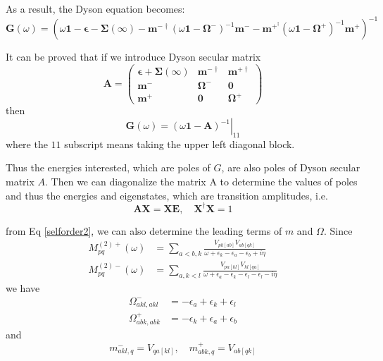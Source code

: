As a result, the Dyson equation becomes:
\begin{equation}
	\boldsymbol{G}(\omega)=\left(\omega \mathbf{1}-\boldsymbol{\epsilon}-\boldsymbol{\Sigma}(\infty)-\boldsymbol{m}^{-\dagger}\left(\omega \mathbf{1}-\boldsymbol{\Omega}^{-}\right)^{-1} \boldsymbol{m}^{-}-\boldsymbol{m}^{+^{\dagger}}\left(\omega \mathbf{1}-\boldsymbol{\Omega}^{+}\right)^{-1} \boldsymbol{m}^{+}\right)^{-1}
\end{equation}

It can be proved that if we introduce Dyson secular matrix
\begin{equation} \label{matrixA}
	\boldsymbol{A}=\left( \begin{array}{ccc}{\boldsymbol{\epsilon}+\boldsymbol{\Sigma}(\infty)} & {\boldsymbol{m}^{-\dagger}} & {\boldsymbol{m}^{+\dagger}} \\ {\boldsymbol{m}^{-}} & {\boldsymbol{\Omega}^{-}} & {\mathbf{0}} \\ {\boldsymbol{m}^{+}} & {\mathbf{0}} & {\boldsymbol{\Omega}^{+}}\end{array}\right)
\end{equation}
then
\begin{equation}
	\boldsymbol{G}(\omega)=\left.(\omega \mathbf{1}-\boldsymbol{A})^{-1}\right|_{11}
\end{equation}
where the $11$ subscript means taking the upper left diagonal block.

Thus the energies interested, which are poles of $G$, are also poles of Dyson secular matrix $A$.
Then we can diagonalize the matrix A to determine the values of poles and thus the energies and eigenstates, which are transition amplitudes, i.e.
\begin{equation}
	\boldsymbol{A} \boldsymbol{X}=\boldsymbol{X} \boldsymbol{E}, \quad \boldsymbol{X}^{\dagger} \boldsymbol{X}=1
\end{equation}

from Eq \ref{selforder2}, we can also determine the leading terms of $m$ and $\Omega$.
Since 
\begin{equation}
	\begin{aligned} 
	M_{p q}^{(2)+}(\omega) &=\sum_{a<b, k} \frac{V_{p k[a b]} V_{a b[q k]}}{\omega+\epsilon_{k}-\epsilon_{a}-\epsilon_{b}+i \eta}
	\\ 
	M_{p q}^{(2)-}(\omega) &=\sum_{a, k<l} \frac{V_{p a[k l]} V_{k l[q a]}}{\omega+\epsilon_{a}-\epsilon_{k}-\epsilon_{l}-\epsilon_{l}-i \eta}
	\end{aligned}
\end{equation}
we have
\begin{equation}
	\begin{aligned} 
	\Omega_{a k l, a k l}^{-} &=-\epsilon_{a}+\epsilon_{k}+\epsilon_{l}
	\\ 
	\Omega_{a b k, a b k}^{+} &=-\epsilon_{k}+\epsilon_{a}+\epsilon_{b} 
	\end{aligned}
\end{equation}
and
\begin{equation} 
	m_{a k l, q}^{-} =V_{q a[k l]}, \quad m_{a b k, q}^{+}=V_{a b[q k]}
\end{equation}

